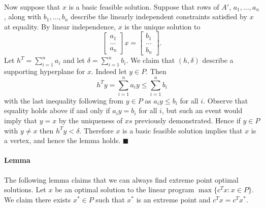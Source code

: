 \paragraph{}
Now suppose that $x$ is a basic feasible solution. Suppose that rows of $A'$, $a_1, \dots, a_n$, along with $b_1, \dots, b_n$ describe the linearly independent constraints satisfied by $x$ at equality. By linear independence, $x$ is the unique solution to 
$$\begin{bmatrix} a_1 \\ \dots \\ a_n \end{bmatrix} x = \begin{bmatrix} b_1 \\ \dots \\ b_n \end{bmatrix}.$$
Let $h^T = \sum_{i=1}^n a_i$ and let $\delta = \sum_{i=1}^n b_i$. We claim that $(h, \delta)$ describe a supporting hyperplane for $x$. Indeed let $y \in P$. Then 
$$ h^T y = \sum_{i=1}^n a_i y \leq \sum_{i=1}^n b_i$$
with the last inequality following from $y \in P$ as $a_i y \leq b_i$ for all $i$. Observe that equality holds above if and only if $a_i y = b_i$ for all $i$, but such an event would imply that $y = x$ by the uniqueness of $xs$ previously demonstrated. Hence if $y \in P$ with $y \neq x$ then $h^T y < \delta$. Therefore $x$ is a basic feasible solution implies that $x$ is a vertex, and hence the lemma holds. $\blacksquare$
\paragraph{Lemma} The following lemma claims that we can always find extreme point optimal solutions. Let $x$ be an optimal solution to the linear program $\max\{c^Tx : x \in P \}$. We claim there exists $x^* \in P$ such that $x^*$ is an extreme point and $c^Tx = c^Tx^*$.
